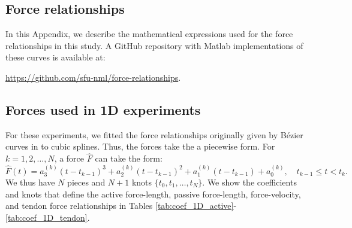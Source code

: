 \documentclass{sfuthesis}
\numberwithin{equation}{section}
\numberwithin{figure}{chapter}
\numberwithin{table}{chapter}
\theoremstyle{definition}
\begin{document}
\begin{appendices} %

\chapter{Force relationships} \label{app:force_relationships}

In this Appendix, we describe the mathematical expressions used for the force relationships in this study. A GitHub repository with Matlab implementations of these curves is available at:
\begin{center}
    \url{https://github.com/sfu-nml/force-relationships}.
\end{center}

\section{Forces used in 1D experiments}

For these experiments, we fitted the force relationships originally given by B\'{e}zier curves in \cite{RossWakeling2016Multibody} to cubic splines. Thus, the forces take the a piecewise form. For $k = 1, 2, \dots, N$, a force $\widehat{F}$ can take the form:
\begin{equation}
    \widehat{F}(t) = a_3^{(k)}(t-t_{k-1})^3 + a_2^{(k)}(t - t_{k-1})^2 + a_1^{(k)}(t-t_{k-1}) + a_0^{(k)}, \quad t_{k-1} \leq t < t_{k}.
\end{equation}
We thus have $N$ pieces and $N+1$ knots $\{t_0, t_1, \dots, t_N\}$. We show the coefficients and knots that define the active force-length, passive force-length, force-velocity, and tendon force relationships in Tables \ref{tab:coef_1D_active}-\ref{tab:coef_1D_tendon}.


\end{appendices}
\end{document}
